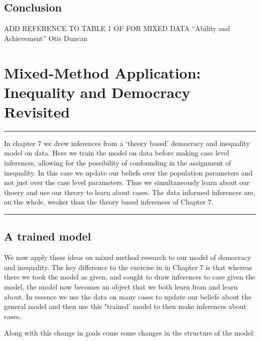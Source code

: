 \documentclass[12pt,]{book}
\begin{document}
\hypertarget{conclusion-1}{%
\section{Conclusion}\label{conclusion-1}}

ADD REFERENCE TO TABLE 1 OF FOR MIXED DATA ``Ability and Achievement'' Otis Duncan

\hypertarget{mixed-method-application-inequality-and-democracy-revisited}{%
\chapter{Mixed-Method Application: Inequality and Democracy Revisited}\label{mixed-method-application-inequality-and-democracy-revisited}}

\begin{center}\rule{0.5\linewidth}{\linethickness}\end{center}

In chapter 7 we drew inferences from a `theory based' democracy and inequality model on data. Here we train the model on data before making case level inferences, allowing for the possibility of confounding in the assignment of inequality. In this case we update our beliefs over the population parameters and not just over the case level parameters. Thus we simultaneously learn about our thoery and use our theory to learn about cases. The data informed inferences are, on the whole, weaker than the theory based inferences of Chapter 7.

\begin{center}\rule{0.5\linewidth}{\linethickness}\end{center}

\hypertarget{a-trained-model}{%
\section{A trained model}\label{a-trained-model}}

We now apply these ideas on mixed method research to our model of democracy and inequality. The key difference to the exercise in in Chapter 7 is that whereas there we took the model as given, and sought to draw inferences to case given the model, the model now becomes an object that we both learn from and learn about. In essence we use the data on many cases to update our beliefs about the general model and then use this "trained' model to then make inferences about cases.

Along with this change in goals come some changes in the structure of the model:
\end{document}
